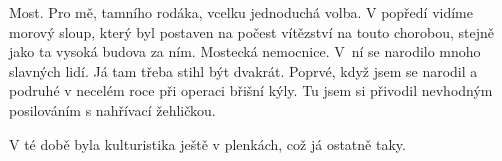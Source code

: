 
Most. Pro mě, tamního rodáka, vcelku jednoduchá volba. V popředí
vidíme morový sloup, který byl postaven na počest vítězství na touto
chorobou, stejně jako ta vysoká budova za ním. Mostecká nemocnice.
V~ní se narodilo mnoho slavných lidí. Já tam třeba stihl být dvakrát.
Poprvé, když jsem se narodil a podruhé v necelém roce při operaci
břišní kýly. Tu jsem si přivodil nevhodným posilováním s nahřívací
žehličkou.

V té době byla kulturistika ještě v plenkách, což já ostatně taky.
